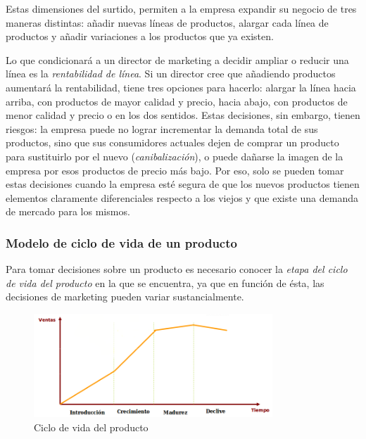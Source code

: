 \documentclass[10pt,a4paper,spanish]{report}
\begin{document}
			Estas dimensiones del surtido, permiten a la empresa expandir su negocio de tres maneras distintas: añadir nuevas líneas de productos, alargar cada línea de productos y añadir variaciones a los productos que ya existen.

			Lo que condicionará a un director de marketing a decidir ampliar o reducir una línea es la \textit{\textcolor[rgb]{0.1,0.2,0.4}{rentabilidad de línea}}. Si un director cree que añadiendo productos aumentará la rentabilidad, tiene tres opciones para hacerlo: alargar la línea hacia arriba, con productos de mayor calidad y precio, hacia abajo, con productos de menor calidad y precio o en los dos sentidos. Estas decisiones, sin embargo, tienen riesgos: la empresa puede no lograr incrementar la demanda total de sus productos, sino que sus consumidores actuales dejen de comprar un producto para sustituirlo por el nuevo (\textit{\textcolor[rgb]{0.1,0.2,0.4}{canibalización}}), o puede dañarse la imagen de la empresa por esos productos de precio más bajo. Por eso, solo se pueden tomar estas decisiones cuando la empresa esté segura de que los nuevos productos tienen elementos claramente diferenciales respecto a los viejos y que existe una demanda de mercado para los mismos.

		\subsubsection{\textcolor[rgb]{0.1,0.2,0.4}Modelo de ciclo de vida de un producto}

			Para tomar decisiones sobre un producto es necesario conocer la \textit{\textcolor[rgb]{0.1,0.2,0.4}{etapa del ciclo de vida del producto}} en la que se encuentra, ya que en función de ésta, las decisiones de marketing pueden variar sustancialmente.

			\begin{figure}
                \centering
                \includegraphics[width=0.8\textwidth]{2}
                \caption{Ciclo de vida del producto}
                \label{vida_p}
            \end{figure}
\end{document}
